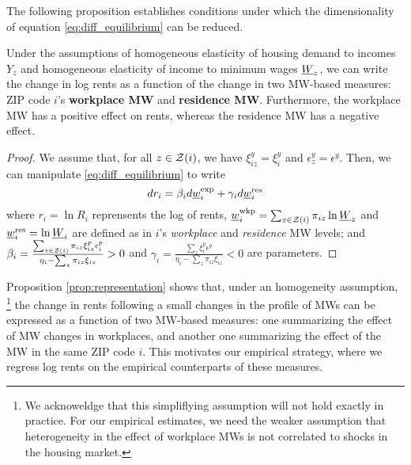 The following proposition establishes conditions under which the dimensionality
of equation \ref{eq:diff_equilibrium} can be reduced.

\begin{prop}[Representation]\label{prop:representation}
    Under the assumptions of 
    homogeneous elasticity of housing demand to incomes $Y_z$ and
    homogeneous elasticity of income to minimum wages $\underline{W}_z$,
    we can write the change in log rents as a function of the change in two 
    MW-based measures: ZIP code $i$'s \textbf{workplace MW} and 
    \textbf{residence MW}.
    Furthermore, the workplace MW has a positive effect on rents, whereas the
    residence MW has a negative effect.
\end{prop}
\begin{proof}
    We assume that, for all $z\in\mathcal{Z}(i)$, we have 
    $\xi^y_{iz}=\xi^y_{i}$ and 
    $\epsilon_z^y=\epsilon^y$.
    Then, we can manipulate \eqref{eq:diff_equilibrium} to write
    \begin{equation} \label{eq:theory_represenation}
        d r_i = \beta_i  d \underline{w}^{\text{exp}}_i
              + \gamma_i d \underline{w}^{\text{res}}_i
    \end{equation}
    where
    $r_i=\ln R_i$ reprensents the log of rents,
    $\underline{w}^{\text{wkp}}_i = \sum_{z\in\mathcal{Z}(i)} \pi_{iz} \ln \underline{W}_z$ and
    $\underline{w}^{\text{res}}_i = \ln \underline{W}_i$ are defined as in $i$'s 
    \textit{workplace} and \textit{residence} MW levels; and
    $\beta_i = \frac{\sum_{z\in\mathcal{Z}(i)}\pi_{iz}\xi_{iz}^{p}\epsilon_{i}^{p}}
                    {\eta_{i} - \sum_z \pi_{iz} \xi_{iz}} 
             >0$ and
    $\gamma_i = \frac{\sum_z \xi_{i}^{y}\epsilon^{y}}
                     {\eta_{i} - \sum_z \pi_{iz} \xi_{iz}} 
              < 0$
    are parameters.
\end{proof}

Proposition \ref{prop:representation} shows that, under an homogeneity assumption,%
\footnote{We acknoweldge that this simpliflying assumption will not hold exactly
in practice.
For our empirical estimates, we need the weaker assumption that heterogeneity in 
the effect of workplace MWs is not correlated to shocks in the housing market.}
the change in rents following a small changes in the profile of MWs can be expressed 
as a function of two MW-based measures: 
one summarizing the effect of MW changes in workplaces,
and another one summarizing the effect of the MW in the same ZIP code $i$.
This motivates our empirical strategy, where we regress log rents on the empirical
counterparts of these measures.

